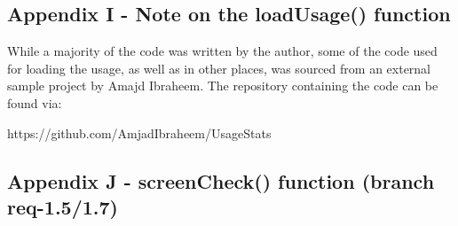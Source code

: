 \documentclass[12pt]{article}
\begin{document}
\subsection*{Appendix I - Note on the loadUsage() function}
While a majority of the code was written by the author, some of the code used for loading the usage, as well as in other places, was sourced from an external sample project by 
Amajd Ibraheem. The repository containing the code can be found via: \newline

\noindent https://github.com/AmjadIbraheem/UsageStats


\pagebreak
\subsection*{Appendix J - screenCheck() function (branch req-1.5/1.7)}
\end{document}
